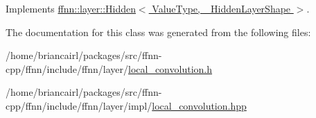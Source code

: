 Implements \hyperlink{classffnn_1_1layer_1_1_hidden_ae038d2a1e64fcbbde6166df7d0573ef8}{ffnn\-::layer\-::\-Hidden$<$ Value\-Type, \-\_\-\-Hidden\-Layer\-Shape $>$}.



The documentation for this class was generated from the following files\-:\begin{DoxyCompactItemize}
\item 
/home/briancairl/packages/src/ffnn-\/cpp/ffnn/include/ffnn/layer/\hyperlink{local__convolution_8h}{local\-\_\-convolution.\-h}\item 
/home/briancairl/packages/src/ffnn-\/cpp/ffnn/include/ffnn/layer/impl/\hyperlink{layer_2impl_2local__convolution_8hpp}{local\-\_\-convolution.\-hpp}\end{DoxyCompactItemize}
